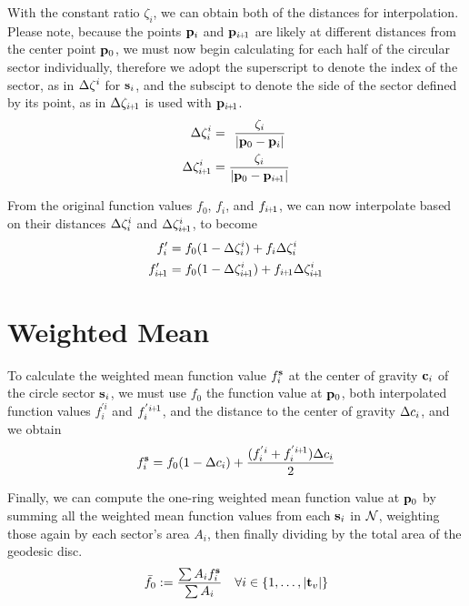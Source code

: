 With the constant ratio $\zeta_i$, we can obtain both of the distances for interpolation. Please note, because the points $\mathbf{p}_i$ and $\bp_{\sipo}$ are likely at different distances from the center point $\mathbf{p}_0$, we must now begin calculating for each half of the circular sector individually, therefore we adopt the superscript to denote the index of the sector, as in $\Delta\zeta^i$ for $\mathbf{s}_i$, and the subscipt to denote the side of the sector defined by its point, as in $\Dz_{\sipo}$ is used with $\bp_{\sipo}$.
\begin{align}
	\Dz^i_i & = \kern4pt\frac{\zeta_i}{|\bp_0 - \bp_i|}
	\label{eq:distanceIForInterpolation}\\
	\Dz^i_{\sipo} & = \frac{\zeta_i}{|\bp_0 - \bp_{\sipo}|}
	\label{eq:distanceIp1ForInterpolation}
\end{align}%
%

From the original function values $f_0$, $f_i$, and $f_{\sipo}$, we can now interpolate based on their distances $\Delta\zeta^i_i$ and $\Dz^i_{\sipo}$, to become
\begin{align}
	f'_i & = f_0(1 - \Dz^i_i) + f_i\Dz^i_i
	\label{eq:interpolatedFi} \\
	f'_{\sipo} & = f_0(1 - \Dz^i_{\sipo}) + f_{\sipo}\Dz^i_{\sipo}
	\label{eq:interpolatedFip1}
\end{align}%
%
%
\section{Weighted Mean}
\label{cFONSsWM}
To calculate the weighted mean function value $f^{\mathbf{s}}_i$ at the center of gravity $\mathbf{c}_i$ of the circle sector $\mathbf{s}_i$, we must use $f_0$ the function value at $\mathbf{p}_0$, both interpolated function values $f^{'i}_i$ and $f^{'\sipo}_i$, and the distance to the center of gravity $\Delta c_i$, and we obtain
\begin{equation}
	f^\bs_i = f_0(1 - \Dc_i) + \frac{(f^{'i}_i + f^{'\sipo}_i)\Dc_i}{2}
	\label{eq:weightedMeanAtCoGatSector}
\end{equation}%
%

Finally, we can compute the one-ring weighted mean function value at $\mathbf{p}_0$ by summing all the weighted mean function values from each $\mathbf{s}_i$ in $\mathcal{N}$, weighting those again by each sector's area $A_i$, then finally dividing by the total area of the geodesic disc.
\begin{equation}
	\bar{f}_0 := \frac{\sum A_if^{\mathbf{s}}_i}{\sum A_i} \quad \forall i \in \{1,\ldots,|\mathbf{t}_v|\}
	\label{eq:meanFuncValAtP0}
\end{equation}%
%
%

